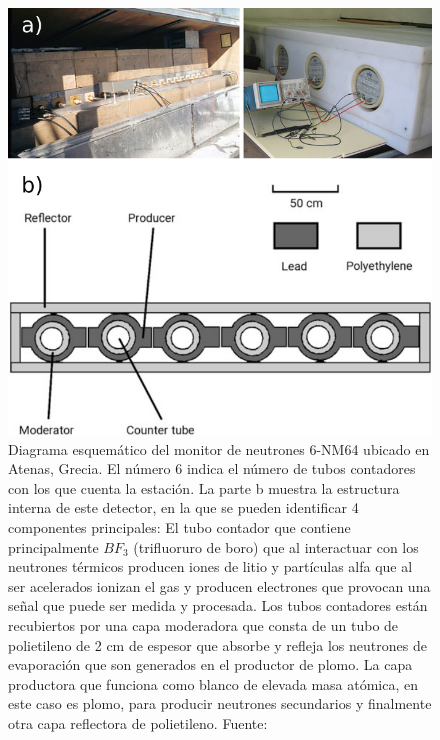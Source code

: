 \begin{figure}
\centering
    \includegraphics[width=0.7\linewidth]{Figs/NM_schem.png}
    \caption[Diagrama esquemático del monitor de neutrones 6-NM64 ubicado en Atenas, Grecia.]{Diagrama esquemático del monitor de neutrones 6-NM64 ubicado en Atenas, Grecia. El número 6 indica el número de tubos contadores con los que cuenta la estación. La parte b muestra la estructura interna de este detector, en la que se pueden identificar 4 componentes principales: El tubo contador que contiene principalmente $BF_{3}$ (trifluoruro de boro) que al interactuar con los neutrones térmicos producen iones de litio y partículas alfa que al ser acelerados ionizan el gas y producen electrones que provocan una señal que puede ser medida y procesada. Los tubos contadores están recubiertos por una capa moderadora que consta de un tubo de polietileno de 2 cm de espesor que absorbe y refleja los neutrones de evaporación que son generados en el productor de plomo. La capa productora que funciona como blanco de elevada masa atómica, en este caso es plomo, para producir neutrones secundarios y finalmente otra capa reflectora de polietileno. Fuente: \cite{OlgaMalandraki_2018}}
    \label{fig:NM_schem}
\end{figure}

